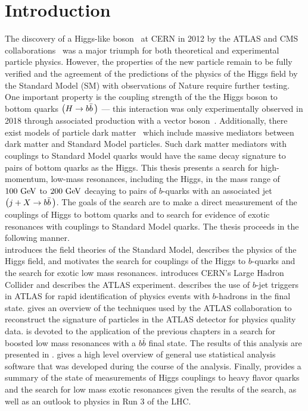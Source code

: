 \chapter{Introduction}\label{chapter:introduction}

The discovery of a Higgs-like boson~\cite{Higgs:1964ia,Higgs:1964pj,Higgs:1966ev,Englert:1964et,Guralnik:1964eu} at CERN in 2012 by the \Gls{ATLAS} and CMS collaborations~\cite{Aad:2012tfa,Chatrchyan:2012xdj} was a major triumph for both theoretical and experimental particle physics.
However, the properties of the new particle remain to be fully verified and the agreement of the predictions of the physics of the Higgs field by the \Gls{Standard Model} (SM) with observations of Nature require further testing.
One important property is the coupling strength of the the Higgs boson to bottom quarks $\left(H \to b\bar{b}\,\right)$ --- this interaction was only experimentally observed in 2018 through associated production with a vector boson~\cite{Aaboud:2018zhk,CMS:2018abb}.
Additionally, there exist models of particle dark matter~\cite{Abdallah:2015ter} which include massive mediators between dark matter and Standard Model particles.
Such \glspl{dark matter mediator} with couplings to Standard Model quarks would have the same decay signature to pairs of bottom quarks as the Higgs.
This thesis presents a search for high-momentum, low-mass resonances, including the Higgs, in the mass range of $100~\mathrm{GeV}$ to $200~\mathrm{GeV}$ decaying to pairs of $b$-quarks with an associated jet $\left(j + X \to b\bar{b}\,\right)$.
The goals of the search are to make a direct measurement of the couplings of Higgs to bottom quarks and to search for evidence of exotic resonances with couplings to Standard Model quarks.
The thesis proceeds in the following manner.\\

 introduces the field theories of the Standard Model, describes the physics of the Higgs field, and motivates the search for couplings of the Higgs to $b$-quarks and the search for exotic low mass resonances.
 introduces CERN's Large Hadron Collider and  describes the ATLAS experiment.
 describes the use of $b$-jet triggers in ATLAS for rapid identification of physics events with $b$-hadrons in the final state.
 gives an overview of the techniques used by the ATLAS collaboration to reconstruct the signature of particles in the ATLAS detector for physics quality data.
 is devoted to the application of the previous chapters in a search for boosted low mass resonances with a $b\bar{b}$ final state.
The results of this analysis are presented in .
 gives a high level overview of general use statistical analysis software that was developed during the course of the analysis.
Finally,  provides a summary of the state of measurements of Higgs couplings to heavy flavor quarks and the search for low mass exotic resonances given the results of the search, as well as an outlook to physics in Run 3 of the LHC.
